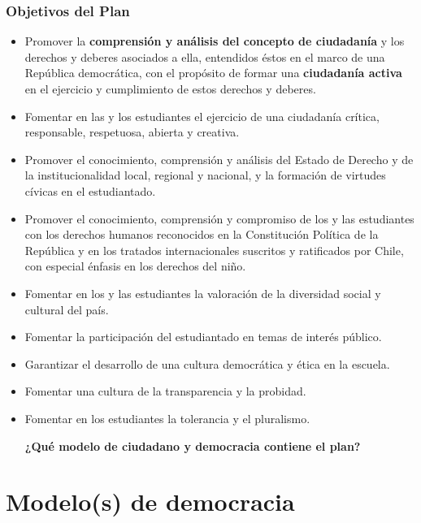 \documentclass[]{beamer} %
\begin{document}
\begin{frame} [allowframebreaks]
	\frametitle{Objetivos del Plan}
	\begin{itemize}
		\item Promover la \textbf{comprensión y análisis del concepto de ciudadanía} y los derechos y deberes asociados a ella, entendidos éstos en el marco de una República democrática, con el propósito de formar una \textbf{ciudadanía activa} en el ejercicio y cumplimiento de estos derechos y deberes.
		\item Fomentar en las y los estudiantes el ejercicio de una ciudadanía crítica, responsable, respetuosa, abierta y creativa.
		\item Promover el conocimiento, comprensión y análisis del Estado de Derecho y de la institucionalidad local, regional y nacional, y la formación de virtudes cívicas en el estudiantado.
	
	\framebreak
		\item Promover el conocimiento, comprensión y compromiso de los y las estudiantes con los derechos humanos reconocidos en la Constitución Política de la República y en los tratados internacionales suscritos y ratificados por Chile, con especial énfasis en los derechos del niño.
		\item Fomentar en los y las estudiantes la valoración de la diversidad social y cultural del país.
		\item Fomentar la participación del estudiantado en temas de interés público.
	
	\framebreak
		\item Garantizar el desarrollo de una cultura democrática y ética en la escuela.
		\item Fomentar una cultura de la transparencia y la probidad.
		\item Fomentar en los estudiantes la tolerancia y el pluralismo.
	\break

		\textbf{¿Qué modelo de ciudadano y democracia contiene el plan?}
	\end{itemize}
\end{frame}	
	
\section{Modelo(s) de democracia}
\end{document}
